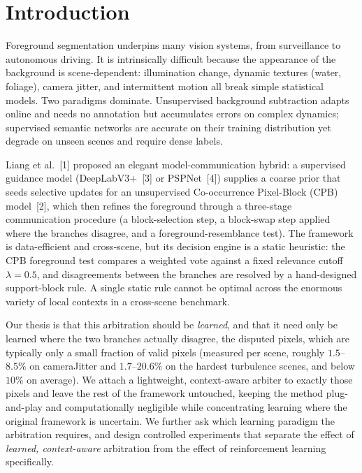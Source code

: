 \documentclass[sn-basic]{sn-jnl}
\begin{document}
\maketitle

\section{Introduction}
Foreground segmentation underpins many vision systems, from surveillance to
autonomous driving. It is intrinsically difficult because the appearance of the
background is scene-dependent: illumination change, dynamic textures (water,
foliage), camera jitter, and intermittent motion all break simple statistical
models. Two paradigms dominate. Unsupervised background subtraction adapts online
and needs no annotation but accumulates errors on complex dynamics; supervised
semantic networks are accurate on their training distribution yet degrade on unseen
scenes and require dense labels.

Liang et al.~[1] proposed an elegant model-communication hybrid: a supervised
guidance model (DeepLabV3+~[3] or PSPNet~[4]) supplies a coarse prior that seeds
selective updates for an unsupervised Co-occurrence Pixel-Block (CPB) model~[2],
which then refines the foreground through a three-stage communication procedure
(a block-selection step, a block-swap step applied where the branches disagree, and a
foreground-resemblance test). The framework is data-efficient and cross-scene, but its
decision engine is a static heuristic: the CPB foreground test compares a weighted vote
against a fixed relevance cutoff $\lambda=0.5$, and disagreements between the branches
are resolved by a hand-designed support-block rule. A single static rule cannot be
optimal across the enormous variety of local contexts in a cross-scene benchmark.

Our thesis is that this arbitration should be \emph{learned}, and that it need only
be learned where the two branches actually disagree, the disputed pixels, which
are typically only a small fraction of valid pixels (measured per scene, roughly
$1.5$--$8.5\%$ on cameraJitter and $1.7$--$20.6\%$ on the hardest turbulence scenes,
and below $10\%$ on average). We attach a lightweight, context-aware arbiter to
exactly those pixels and leave the rest of the framework untouched, keeping the
method plug-and-play and computationally negligible while concentrating learning
where the original framework is uncertain. We further ask which learning paradigm
the arbitration requires, and design controlled experiments that separate the
effect of \emph{learned, context-aware} arbitration from the effect of
reinforcement learning specifically.
\end{document}
